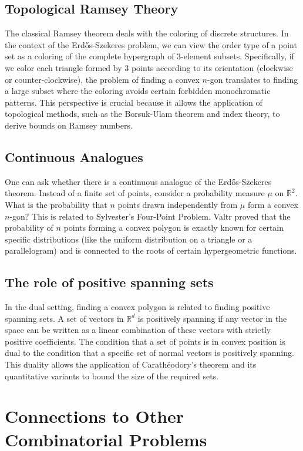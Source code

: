 \documentclass[11pt,a4paper]{article}
\begin{document}
\subsection{Topological Ramsey Theory}
The classical Ramsey theorem deals with the coloring of discrete structures. In the context of the Erd\H{o}s-Szekeres problem, we can view the order type of a point set as a coloring of the complete hypergraph of 3-element subsets.
Specifically, if we color each triangle formed by 3 points according to its orientation (clockwise or counter-clockwise), the problem of finding a convex $n$-gon translates to finding a large subset where the coloring avoids certain forbidden monochromatic patterns.
This perspective is crucial because it allows the application of topological methods, such as the Borsuk-Ulam theorem and index theory, to derive bounds on Ramsey numbers.

\subsection{Continuous Analogues}
One can ask whether there is a continuous analogue of the Erd\H{o}s-Szekeres theorem. Instead of a finite set of points, consider a probability measure $\mu$ on $\mathbb{R}^2$. What is the probability that $n$ points drawn independently from $\mu$ form a convex $n$-gon?
This is related to Sylvester's Four-Point Problem. Valtr proved that the probability of $n$ points forming a convex polygon is exactly known for certain specific distributions (like the uniform distribution on a triangle or a parallelogram) and is connected to the roots of certain hypergeometric functions.

\subsection{The role of positive spanning sets}
In the dual setting, finding a convex polygon is related to finding positive spanning sets. A set of vectors in $\mathbb{R}^d$ is positively spanning if any vector in the space can be written as a linear combination of these vectors with strictly positive coefficients.
The condition that a set of points is in convex position is dual to the condition that a specific set of normal vectors is positively spanning. This duality allows the application of Carath\'eodory's theorem and its quantitative variants to bound the size of the required sets.

\section{Connections to Other Combinatorial Problems}
\end{document}
